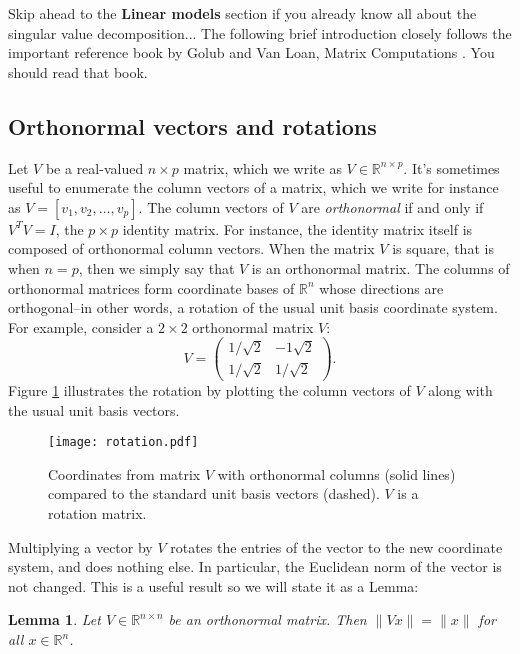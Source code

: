 \documentclass[10pt]{article} %
\newtheorem{lemma}{Lemma}
\newcommand{\R}{{\mathbb R}}
\begin{document}
Skip ahead to the {\bf Linear models} section if you already know all about the
singular value decomposition...  The following brief introduction closely
follows the important reference book by Golub and Van Loan, Matrix Computations
\cite{gvl}. You should read that book.

\subsection*{Orthonormal vectors and rotations}

Let $V$ be a real-valued $n\times p$ matrix, which we write as
$V\in\R^{n\times p}$.  It's sometimes useful to enumerate the
column vectors of a matrix, which we write for instance as $V=[v_1, v_2,
\ldots, v_p]$.  The column vectors of $V$ are {\it orthonormal} if and only if
$V^T V = I$, the $p\times p$ identity matrix.  For instance, the identity
matrix itself is composed of orthonormal column vectors.  When the matrix $V$
is square, that is when $n=p$, then we simply say that $V$ is an orthonormal
matrix.
The columns of orthonormal matrices form coordinate bases of $\R^n$
whose directions are orthogonal--in other words, a rotation of
the usual unit basis coordinate system. For example, consider a $2\times 2$
orthonormal matrix $V$:
\[
V = \left(\begin{array}{cc}
1/{\sqrt{2}} & -1{\sqrt{2}} \\
1/{\sqrt{2}} & 1/{\sqrt{2}}
\end{array}\right).
\]
Figure \ref{chxx_rotation} illustrates the rotation by plotting
the column vectors of $V$ along with the usual unit basis vectors.
\begin{figure}
\begin{center}
\texttt{[image: rotation.pdf]}
\end{center}
\caption{Coordinates from matrix $V$ with orthonormal columns (solid lines)
compared to the standard unit basis vectors (dashed). $V$ is a rotation
matrix.}
\label{chxx_rotation}
\end{figure}
Multiplying a vector by $V$ rotates the entries of the vector to the
new coordinate system, and does nothing else. In particular, the Euclidean
norm of the vector is not changed. This is a useful result so we will state
it as a Lemma:
\begin{lemma}\label{invariant}
Let $V\in\R^{n\times n}$ be an orthonormal matrix. Then
$\|Vx\|=\|x\|$ for all $x\in\R^n$.
\end{lemma}
\end{document}
